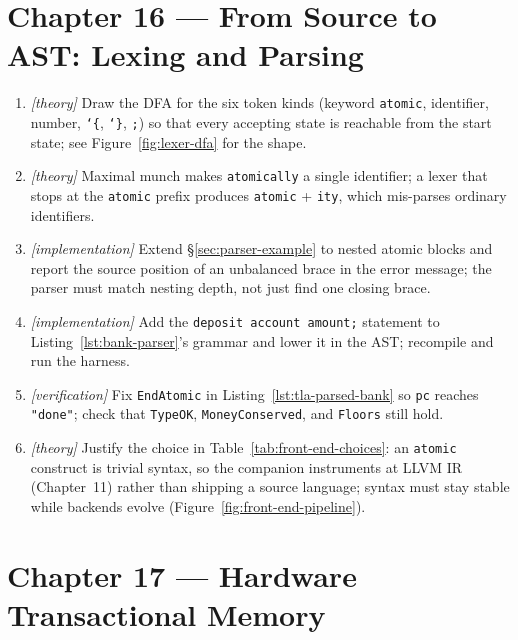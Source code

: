 \section*{Chapter 16 --- From Source to AST: Lexing and Parsing}

\begin{enumerate}
    \item \emph{[theory]} Draw the DFA for the six token kinds (keyword
          \texttt{atomic}, identifier, number, \texttt{\char`\{},
          \texttt{\char`\}}, \texttt{;}) so that every accepting state is
          reachable from the start state; see
          Figure~\ref{fig:lexer-dfa} for the shape.
    \item \emph{[theory]} Maximal munch makes \texttt{atomically} a single
          identifier; a lexer that stops at the \texttt{atomic} prefix
          produces \texttt{atomic} + \texttt{ity}, which mis-parses
          ordinary identifiers.
    \item \emph{[implementation]} Extend \S\ref{sec:parser-example} to
          nested atomic blocks and report the source position of an
          unbalanced brace in the error message; the parser must match
          nesting depth, not just find one closing brace.
    \item \emph{[implementation]} Add the \texttt{deposit account amount;}
          statement to Listing~\ref{lst:bank-parser}'s grammar and lower it
          in the AST; recompile and run the harness.
    \item \emph{[verification]} Fix \texttt{EndAtomic} in
          Listing~\ref{lst:tla-parsed-bank} so \texttt{pc} reaches
          \texttt{"done"}; check that \texttt{TypeOK}, \texttt{MoneyConserved},
          and \texttt{Floors} still hold.
    \item \emph{[theory]} Justify the choice in
          Table~\ref{tab:front-end-choices}: an \texttt{atomic} construct is
          trivial syntax, so the companion instruments at LLVM IR
          (Chapter~11) rather than shipping a source language; syntax must
          stay stable while backends evolve
          (Figure~\ref{fig:front-end-pipeline}).
\end{enumerate}

\section*{Chapter 17 --- Hardware Transactional Memory}


